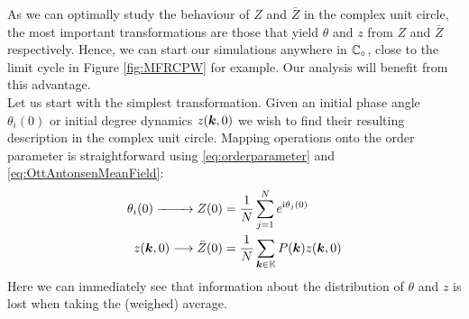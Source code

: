 
As we can optimally study the behaviour of $Z$ and $\bar{Z}$ in the complex unit circle, the most important transformations are those that yield $\theta$ and $z$ from $Z$ and $\bar{Z}$ respectively. Hence, we can start our simulations anywhere in $\mathbb{C}_\circ$, close to the limit cycle in Figure \ref{fig:MFRCPW} for example. Our analysis will benefit from this advantage. \\



Let us start with the simplest transformation. Given an initial phase angle $\theta_i(0)$ or initial degree dynamics $z({\boldsymbol{k}}, 0)$ we wish to find their resulting description in the complex unit circle. Mapping operations onto the order parameter is straightforward using \eqref{eq:orderparameter} and \eqref{eq:OttAntonsenMeanField}:
\begin{align}
\theta_i(0) \xrightarrow{\hspace*{8mm}} Z(0) &= \frac{1}{N} \sum_{j=1}^N e^{{\rm{i}}\theta_j(0)} \label{eq:thetatoZ}\\
z({\boldsymbol{k}},0) \longrightarrow \bar{Z}(0) &= \frac{1}{N} \sum_{{\boldsymbol{k}} \in {\mathbb{K}}} P({\boldsymbol{k}}) z({\boldsymbol{k}}, 0)  \label{eq:ztoZ}
\end{align}
Here we can immediately see that information about the distribution of $\theta$ and $z$ is lost when taking the (weighed) average. 

